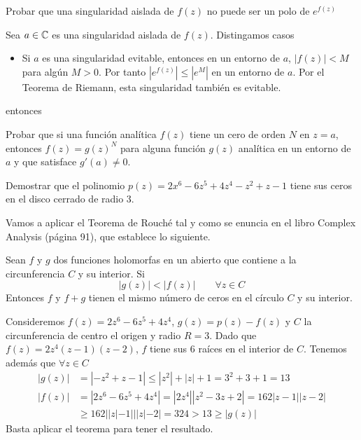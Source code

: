 \documentclass[twoside]{article}
\begin{document}
\begin{ejercicio}{3}
Probar que una singularidad aislada de $f(z)$ no puede ser un polo de $e^{f(z)}$ 
\end{ejercicio}
\begin{solucion}
Sea $a\in \mathbb{C}$ es una singularidad aislada de $f(z)$. Distingamos casos
\begin{itemize}
\item Si $a$ es una singularidad evitable, entonces en un entorno de $a$, $|f(z)|<M$ para algún $M>0$. Por tanto $|e^{f(z)}| \leq |e^M|$ en un entorno de $a$. Por el Teorema de Riemann, esta singularidad también es evitable.

\end{itemize} entonces 
\end{solucion}
\newpage

\begin{ejercicio}{4}
Probar que si una función analítica $f(z)$ tiene un cero de orden $N$ en $z=a$, entonces $f(z)=g(z)^N$ para alguna función $g(z)$ analítica en un entorno de $a$ y que satisface $g'(a)\neq 0$.
\end{ejercicio}
\begin{solucion}

\end{solucion}
\newpage

\begin{ejercicio}{5}
Demostrar que el polinomio $p(z)=2x^6-6z^5+4z^4-z^2+z-1$ tiene sus ceros en el disco cerrado de radio $3$.
\begin{solucion}
Vamos a aplicar el Teorema de Rouché tal y como se enuncia en el libro Complex Analysis (página 91), que establece lo siguiente.
\begin{theorem}
Sean $f$ y $g$ dos funciones holomorfas en un abierto que contiene a la circunferencia $C$ y su interior. Si 
$$|g(z)|<|f(z)| \qquad \forall z \in C
$$
Entonces $f$ y $f+g$ tienen el mismo número de ceros en el  círculo $C$ y su interior. 
\end{theorem}
Consideremos $f(z)=2z^6-6z^5+4z^4$, $g(z)=p(z)-f(z)$ y $C$ la circunferencia de centro el origen y radio $R=3$. Dado que $f(z)=2z^4(z-1)(z-2)$, $f$ tiene sus 6 raíces en el interior de $C$. Tenemos además que $\forall z \in C$ 
\begin{align*}
|g(z)|&=|-z^2+z-1|\leq |z^2|+|z|+1 = 3^2+3+1=13\\
|f(z)|&=|2z^6-6z^5+4z^4|=|2z^4||z^2-3z+2|=162|z-1||z-2|\\
&\geq 162||z|-1|||z|-2| = 324 > 13 \geq |g(z)|
\end{align*}
Basta aplicar el teorema para tener el resultado.
\end{solucion}
\end{ejercicio}
\end{document}
